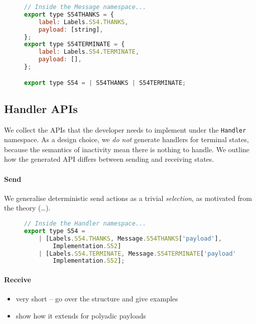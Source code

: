 \begin{figure}[!ht]
\begin{lstlisting}[language=javascript, tabsize=2]
// Inside the Message namespace...
export type S54THANKS = {
	label: Labels.S54.THANKS,
	payload: [string],
};
export type S54TERMINATE = {
	label: Labels.S54.TERMINATE,
	payload: [],
};

export type S54 = | S54THANKS | S54TERMINATE;
\end{lstlisting}
\end{figure}

\subsection{Handler APIs}

We collect the APIs that the developer needs to implement
under the \texttt{Handler} namespace. 
As a design choice, we \textit{do not} generate handlers for
terminal states, because the semantics of inactivity mean
there is nothing to handle.
We outline how the generated API differs between sending
and receiving states.

\paragraph{Send}
We generalise deterministic send actions as a trivial \textit{selection}, 
as motivated from the theory (\dots).

\begin{figure}[!ht]
\begin{lstlisting}[language=javascript, tabsize=2]
// Inside the Handler namespace...
export type S54 = 
	| [Labels.S54.THANKS, Message.S54THANKS['payload'],
		Implementation.S52] 
	| [Labels.S54.TERMINATE, Message.S54TERMINATE['payload'], 
		Implementation.S52];
\end{lstlisting}
\end{figure}

\paragraph{Receive}
\begin{itemize}
\item very short -- go over the structure and give examples
\item show how it extends for polyadic payloads
\end{itemize}

